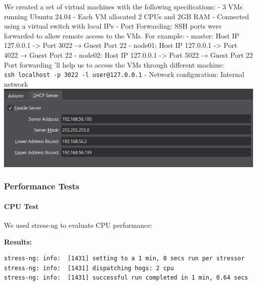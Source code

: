 We created a set of virtual machines with the following specifications:
- 3 VMs running Ubuntu 24.04 - Each VM allocated 2 CPUs and 2GB RAM -
Connected using a virtual switch with local IPs - Port Forwarding: SSH
ports were forwarded to allow remote access to the VMs. For example: -
master: Host IP 127.0.0.1 -\textgreater{} Port 3022 → Guest Port 22 -
node01: Host IP 127.0.0.1 -\textgreater{} Port 4022 → Guest Port 22 -
node02: Host IP 127.0.0.1 -\textgreater{} Port 5022 → Guest Port 22 Port
forwarding 'll help us to access the VMs through different machine:
\texttt{ssh\ localhost\ -p\ 3022\ -l\ user@127.0.0.1} - Network
configuration: Internal network
\includegraphics{visualizations/Adapter.png}

\hypertarget{performance-tests}{%
\subsubsection{Performance Tests}\label{performance-tests}}

\hypertarget{cpu-test}{%
\paragraph{CPU Test}\label{cpu-test}}

We used stress-ng to evaluate CPU performance:

\begin{Shaded}
\begin{Highlighting}[]
 
\end{Highlighting}
\end{Shaded}

\textbf{Results:}

\begin{verbatim}
stress-ng: info:  [1431] setting to a 1 min, 0 secs run per stressor
stress-ng: info:  [1431] dispatching hogs: 2 cpu
stress-ng: info:  [1431] successful run completed in 1 min, 0.64 secs
\end{verbatim}


